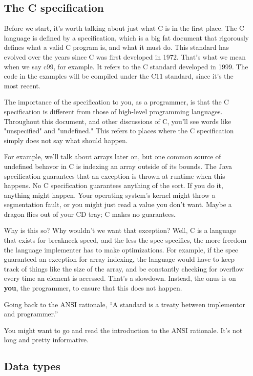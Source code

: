 \documentclass[ebook,11pt,oneside,openany]{memoir}
\begin{document}
\subsection{The C specification}

Before we start, it's worth talking about just what C is in the first place. The C language is defined by a specification, which is a big fat document that rigorously defines what a valid C program is, and what it must do. This standard has evolved over the years since C was first developed in 1972. That's what we mean when we say c99, for example. It refers to the C standard developed in 1999. The code in the examples will be compiled under the C11 standard, since it's the most recent.

The importance of the specification to you, as a programmer, is that the C specification is different from those of high-level programming languages. Throughout this document, and other discussions of C, you'll see words like "unspecified" and "undefined." This refers to places where the C specification simply does not say what should happen. 

For example, we'll talk about arrays later on, but one common source of undefined behavor in C is indexing an array outside of its bounds. The Java specification guarantees that an exception is thrown at runtime when this happens. No C specification guarantees anything of the sort. If you do it, anything might happen. Your operating system's kernel might throw a segmentation fault, or you might just read a value you don't want. Maybe a dragon flies out of your CD tray; C makes no guarantees.

Why is this so? Why wouldn't we want that exception? Well, C is a language that exists for breakneck speed, and the less the spec specifies, the more freedom the language implementer has to make optimizations. For example, if the spec guaranteed an exception for array indexing, the language would have to keep track of things like the size of the array, and be constantly checking for overflow every time an element is accessed. That's a slowdown. Instead, the onus is on \textbf{you}, the programmer, to ensure that this does not happen.

Going back to the ANSI rationale, ``A standard is a treaty between implementor and programmer.''

You might want to go and read the introduction to the ANSI rationale. It's not long and pretty informative.

\subsection{Data types}
\end{document}
